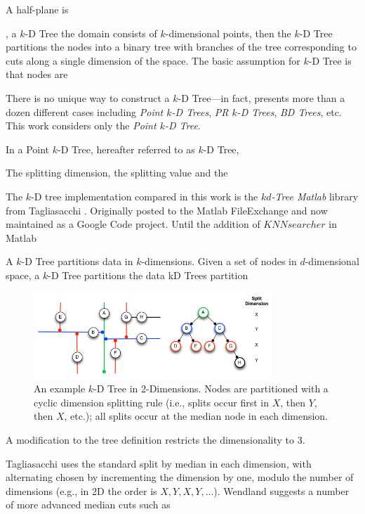 \documentclass{report}
\begin{document}
A half-plane is 

, a $k$-D Tree  the domain consists of $k$-dimensional points, then the $k$-D Tree partitions the nodes into a binary tree with branches of the tree corresponding to cuts along a single dimension of the space. The basic assumption for $k$-D Tree is that nodes are 

There is no unique way to construct a $k$-D Tree---in fact, \cite{Samet2005} presents more than a dozen different cases including \emph{Point $k$-D Trees}, \emph{PR $k$-D Trees}, \emph{BD Trees}, etc. This work considers only the \emph{Point $k$-D Tree}. 

In a Point $k$-D Tree, hereafter referred to as $k$-D Tree, 

The splitting dimension, the splitting value and the 


The $k$-D tree implementation compared in this work is the \emph{$kd$-Tree Matlab} library from Tagliasacchi \cite{TagliasacchiMFE,TagliasacchiGC}. Originally posted to the Matlab FileExchange and now maintained as a Google Code project. Until the addition of $KNNsearcher$ in Matlab 

A $k$-D Tree partitions data in $k$-dimensions. 
Given a set of nodes in $d$-dimensional space, a $k$-D Tree partitions the data 
kD Trees partition 

\begin{figure}
\centering
\includegraphics[width=0.8\textwidth]{rbffd_methods_content/neighbors/kdTree_Start.png}
\caption{An example $k$-D Tree in 2-Dimensions. Nodes are partitioned with a cyclic dimension splitting rule (i.e., splits occur first in $X$, then $Y$, then $X$, etc.); all splits occur at the median node in each dimension.}
\label{fig:kdtree_example}
\end{figure}

A modification to the tree definition restricts the dimensionality to 3. 


Tagliasacchi \cite{TagliasacchiGC} uses the standard split by median in each dimension, with alternating chosen by incrementing the dimension by one, modulo the number of dimensions (e.g., in 2D the order is $X, Y, X, Y, ...$). Wendland \cite{WendlandBook} suggests a number of more advanced median cuts such as 
\end{document}
